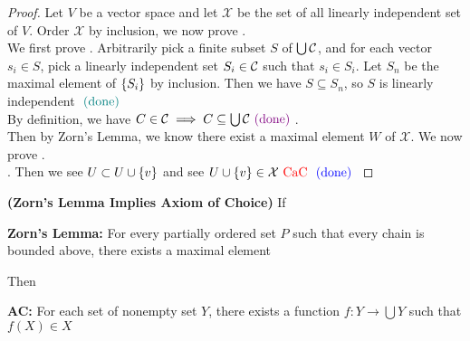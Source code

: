 \documentclass{report}
\begin{document}
\begin{proof}
  Let $V$ be a vector space and let  $\mathcal{X}$ be the set of all linearly independent set of  $V$.  Order  $\mathcal{X}$ by inclusion, we now prove .\\

We first prove . Arbitrarily pick a finite subset $S$ of  $\bigcup \mathcal{C}$, and for each vector $s_i \in S$, pick a linearly independent set $S_i \in \mathcal{C}$ such that $s_i \in S_i$. Let $S_n$ be the maximal element of  $\{ S_i \}$ by inclusion. Then we have $S\subseteq S_n$, so $S$ is linearly independent $\textcolor{teal}{\text{ (done) }}$\\

By definition, we have $C\in \mathcal{C}\implies C \subseteq \bigcup \mathcal{C}\textcolor{violet}{\text{ (done) }}$.\\

Then by Zorn's Lemma, we know there exist a maximal element $W$ of $\mathcal{X}$. We now prove .\\

. Then we see $U\subset U\cup \{ v \}$ and see $U\cup \{ v \}\in \mathcal{X}\text{ \textcolor{red}{CaC} }\textcolor{blue}{\text{ (done) }}$
\end{proof}
\begin{theorem}
\label{0.3.12}
\textbf{(Zorn's Lemma Implies Axiom of Choice)} If 
\begin{center}
    \begin{minipage}{0.9\linewidth}  
        \centering
\textbf{Zorn's Lemma:} For every partially ordered set $P$ such that every chain is bounded above, there exists a maximal element     
    \end{minipage}
\end{center}
Then
\begin{center}
    \begin{minipage}{0.9\linewidth}  
        \centering
        \textbf{AC:} For each set of nonempty set  $Y$, there exists a function $f:Y\rightarrow \bigcup Y$ such that $f(X)\in X$ 
    \end{minipage}
\end{center}
\end{theorem}
\end{document}
